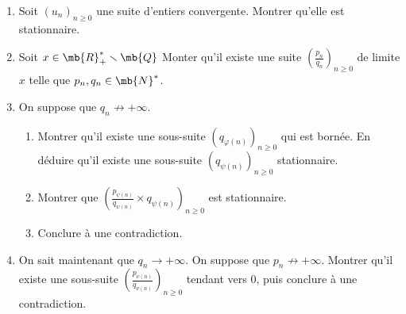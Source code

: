 
\begin{enumerate}

\item Soit $(u_n)_{n \ge 0}$ une suite d'entiers convergente. Montrer qu'elle est stationnaire.

\item Soit $x\in \mb{R}^*_+ \smallsetminus \mb{Q}$ Monter qu'il existe une suite $\left(\frac{p_n}{q_n}\right)_{n \ge 0}$ de limite $x$ telle que $p_n, q_n \in \mb{N}^*$.

\item On suppose que $q_n \not \rightarrow + \infty$.

\begin{enumerate}

\item Montrer qu'il existe une sous-suite $(q_{\varphi(n)})_{n \ge 0}$ qui est bornée. En déduire qu'il existe une sous-suite $(q_{\psi(n)})_{n \ge 0}$ stationnaire.

\item Montrer que $\left(\frac{p_{\psi(n)}}{q_{\psi(n)}} \times q_{\psi(n)}\right)_{n \ge 0}$ est stationnaire.

\item Conclure à une contradiction.
\end{enumerate}

\item On sait maintenant que $q_n \to + \infty$. On suppose que $p_n \not \rightarrow + \infty$. Montrer qu'il existe une sous-suite $\left(\frac{p_{\nu(n)}}{q_{\nu(n)}}\right)_{n \ge 0}$ tendant vers $0$, puis conclure à une contradiction.

\end{enumerate}

